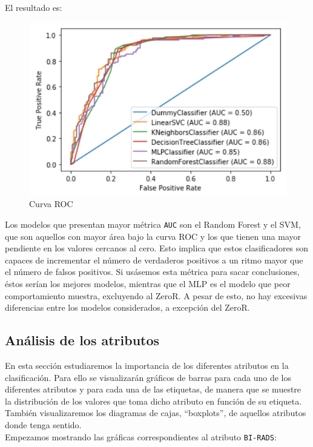 \documentclass[a4]{article}
\begin{document}
El resultado es:

\begin{figure}[H]
  \centering
  \caption{Curva ROC}
  \includegraphics[width=131mm]{imagenes/ROC}
\end{figure}

Los modelos que presentan mayor métrica \texttt{AUC} son el Random Forest y el SVM, que son aquellos con mayor área bajo la curva ROC y los que tienen una mayor pendiente en los valores cercanos al cero. Esto implica que estos clasificadores son capaces de incrementar el número de verdaderos positivos a un ritmo mayor que el número de falsos positivos. Si usásemos esta métrica para sacar conclusiones, éstos serían los mejores modelos, mientras que el  MLP es el modelo que peor comportamiento muestra, excluyendo al ZeroR. A pesar de esto, no hay excesivas diferencias entre los modelos considerados, a excepción del ZeroR.

\subsection{Análisis de los atributos}

En esta sección estudiaremos la importancia de los diferentes atributos en la clasificación. Para ello se visualizarán gráficos de barras para cada uno de los diferentes atributos y para cada una de las etiquetas, de manera que se muestre la distribución de los valores que toma dicho atributo en función de su etiqueta. También visualizaremos los diagramas de cajas, ``boxplots'', de aquellos atributos donde tenga sentido.\\

Empezamos mostrando las gráficas correspondientes al atributo \texttt{BI-RADS}:
\end{document}
